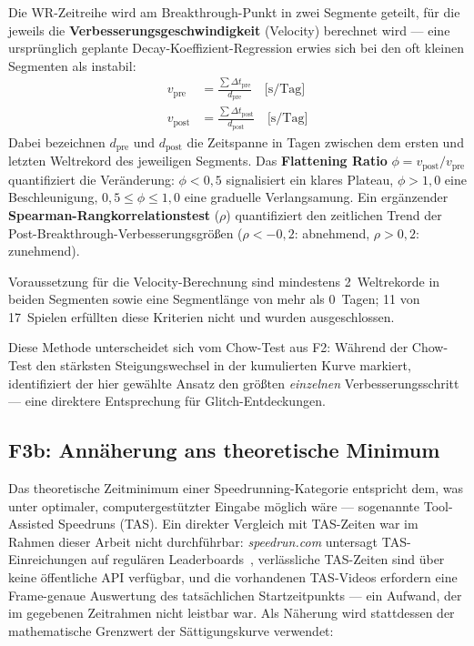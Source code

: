 Die WR-Zeitreihe wird am Breakthrough-Punkt in zwei Segmente geteilt, für die jeweils die \textbf{Verbesserungsgeschwindigkeit} (Velocity) berechnet wird --- eine ursprünglich geplante Decay-Koeffizient-Regression erwies sich bei den oft kleinen Segmenten als instabil:
\begin{align*}
    v_{\text{pre}}  &= \frac{\sum \Delta t_{\text{pre}}}{d_{\text{pre}}} \quad \text{[s/Tag]}\\
    v_{\text{post}} &= \frac{\sum \Delta t_{\text{post}}}{d_{\text{post}}} \quad \text{[s/Tag]}
\end{align*}
Dabei bezeichnen $d_{\text{pre}}$ und $d_{\text{post}}$ die Zeitspanne in Tagen zwischen dem ersten und letzten Weltrekord des jeweiligen Segments. Das \textbf{Flattening Ratio} $\phi = v_{\text{post}} / v_{\text{pre}}$ quantifiziert die Veränderung: $\phi < 0{,}5$ signalisiert ein klares Plateau, $\phi > 1{,}0$ eine Beschleunigung, $0{,}5 \leq \phi \leq 1{,}0$ eine graduelle Verlangsamung. Ein ergänzender \textbf{Spearman-Rangkorrelationstest} ($\rho$) quantifiziert den zeitlichen Trend der Post-Breakthrough-Verbesserungsgrößen ($\rho < -0{,}2$: abnehmend, $\rho > 0{,}2$: zunehmend).

Voraussetzung für die Velocity-Berechnung sind mindestens 2~Weltrekorde in beiden Segmenten sowie eine Segmentlänge von mehr als 0~Tagen; 11 von 17~Spielen erfüllten diese Kriterien nicht und wurden ausgeschlossen.

Diese Methode unterscheidet sich vom Chow-Test aus F2: Während der Chow-Test den stärksten Steigungswechsel in der kumulierten Kurve markiert, identifiziert der hier gewählte Ansatz den größten \emph{einzelnen} Verbesserungsschritt --- eine direktere Entsprechung für Glitch-Entdeckungen.

\subsection*{F3b: Annäherung ans theoretische Minimum}

Das theoretische Zeitminimum einer Speedrunning-Kategorie entspricht dem, was unter optimaler, computergestützter Eingabe möglich wäre --- sogenannte Tool-Assisted Speedruns (TAS). Ein direkter Vergleich mit TAS-Zeiten war im Rahmen dieser Arbeit nicht durchführbar: \textit{speedrun.com} untersagt TAS-Einreichungen auf regulären Leaderboards~\cite{speedruncom_rules}, verlässliche TAS-Zeiten sind über keine öffentliche API verfügbar, und die vorhandenen TAS-Videos erfordern eine Frame-genaue Auswertung des tatsächlichen Startzeitpunkts --- ein Aufwand, der im gegebenen Zeitrahmen nicht leistbar war. Als Näherung wird stattdessen der mathematische Grenzwert der Sättigungskurve verwendet:

